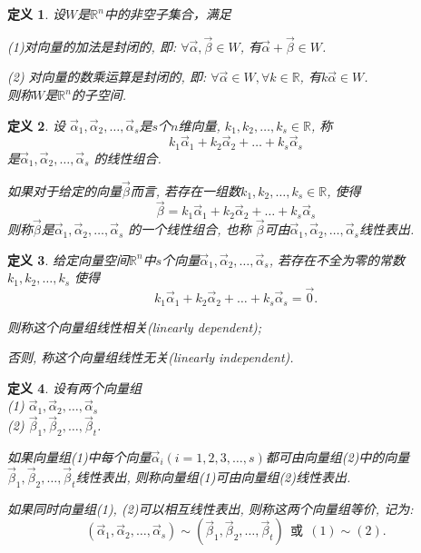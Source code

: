\documentclass[a4paper]{book}
\newtheorem{Def}{定义}[chapter]
\begin{document}
\begin{Def}
设$W$是$\mathbb{R}^n$中的非空子集合，满足

(1)对向量的加法是封闭的, 即: $\forall \vec{\alpha},\vec{\beta}\in W$, 有$\vec{\alpha}+\vec{\beta}\in W$.

(2) 对向量的数乘运算是封闭的, 即: $\forall \vec{\alpha}\in W, \forall k\in \mathbb{R}$, 有$k\vec{\alpha}\in W$.\\
则称$W$是$\mathbb{R}^n$的子空间.

\end{Def}

\begin{Def}
设 $\vec{\alpha}_1,\vec{\alpha}_2,\dots, \vec{\alpha}_s$是$s$个$n$维向量, $k_1,k_2,\dots,k_s\in\mathbb{R}$, 称$$k_1\vec{\alpha}_1+k_2\vec{\alpha}_2+\dots+k_s\vec{\alpha}_s$$是$\vec{\alpha}_1,\vec{\alpha}_2,\dots, \vec{\alpha}_s$ 的线性组合.

如果对于给定的向量$\vec{\beta}$而言, 若存在一组数$k_1,k_2,\dots,k_s\in\mathbb{R}$, 使得$$\vec{\beta}=k_1\vec{\alpha}_1+k_2\vec{\alpha}_2+\dots+k_s\vec{\alpha}_s$$
则称$\vec{\beta}$是$\vec{\alpha}_1,\vec{\alpha}_2,\dots, \vec{\alpha}_s$ 的一个线性组合, 也称 $\vec{\beta}$可由$\vec{\alpha}_1,\vec{\alpha}_2,\dots, \vec{\alpha}_s$线性表出.
\end{Def}

\begin{Def}
给定向量空间$\mathbb{R}^n$中$s$个向量$\vec{\alpha}_1,\vec{\alpha}_2,\dots, \vec{\alpha}_s$, 若存在不全为零的常数 $k_1, k_2,\dots, k_s$  使得
$$k_1\vec{\alpha}_1+k_2\vec{\alpha}_2+\dots+k_s \vec{\alpha}_s=\vec{0}.$$

则称这个向量组线性相关(linearly dependent);

否则, 称这个向量组线性无关(linearly independent).

\end{Def}

\begin{Def}
设有两个向量组 \\
(1) $\vec{\alpha}_1,\vec{\alpha}_2,\dots, \vec{\alpha}_s$\\
(2) $\vec{\beta}_1,\vec{\beta}_2,\dots,\vec{\beta}_t$.

如果向量组(1)中每个向量$\vec{\alpha}_i(i=1,2,3,\dots,s)$都可由向量组(2)中的向量$\vec{\beta}_1,\vec{\beta}_2,\dots,\vec{\beta}_t$线性表出, 则称向量组(1)可由向量组(2)线性表出.

如果同时向量组(1), (2)可以相互线性表出,  则称这两个向量组等价, 记为:
\begin{displaymath}
( \vec{\alpha}_1,\vec{\alpha}_2,\dots, \vec{\alpha}_s)\sim(\vec{\beta}_1,\vec{\beta}_2,\dots,\vec{\beta}_t)\ \ \mbox{或}\ \ (1)\sim(2).
\end{displaymath}

\end{Def}
\end{document}
